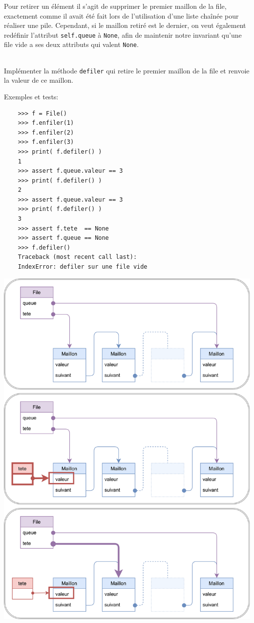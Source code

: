 \documentclass[a4paper,17pt]{extarticle}
\let\origfigure\figure
\let\endorigfigure\endfigure
\renewenvironment{figure}[1][2] {
    \expandafter\origfigure\expandafter[H]
} {
    \endorigfigure
}
\newenvironment{eleve}%
{\begin{activite}\color{noiramu}\\[-0.5cm]}
{\end{activite}}
\begin{document}
    Pour retirer un élément il s'agit de supprimer le premier maillon de la
file, exactement comme il avait été fait lors de l'utilisation d'une
liste chaînée pour réaliser une pile. Cependant, si le maillon retiré
est le dernier, on veut également redéfinir l'attribut
\texttt{self.queue} à \texttt{None}, afin de maintenir notre invariant
qu'une file vide a ses deux attributs qui valent \texttt{None}.
\begin{eleve}
    Implémenter la méthode \texttt{defiler} qui retire le premier maillon de
la file et renvoie la valeur de ce maillon.

Exemples et tests:

\begin{verbatim}
    >>> f = File()
    >>> f.enfiler(1)
    >>> f.enfiler(2)
    >>> f.enfiler(3)
    >>> print( f.defiler() )
    1
    >>> assert f.queue.valeur == 3
    >>> print( f.defiler() )
    2
    >>> assert f.queue.valeur == 3
    >>> print( f.defiler() )
    3
    >>> assert f.tete  == None
    >>> assert f.queue == None
    >>> f.defiler()
    Traceback (most recent call last):
    IndexError: defiler sur une file vide
\end{verbatim}
        
        \end{eleve}
    \begin{figure}
\centering
\includegraphics{img-defiler.png}
\caption{Algorithme pour defiler une valeur}
\end{figure}
\end{document}
